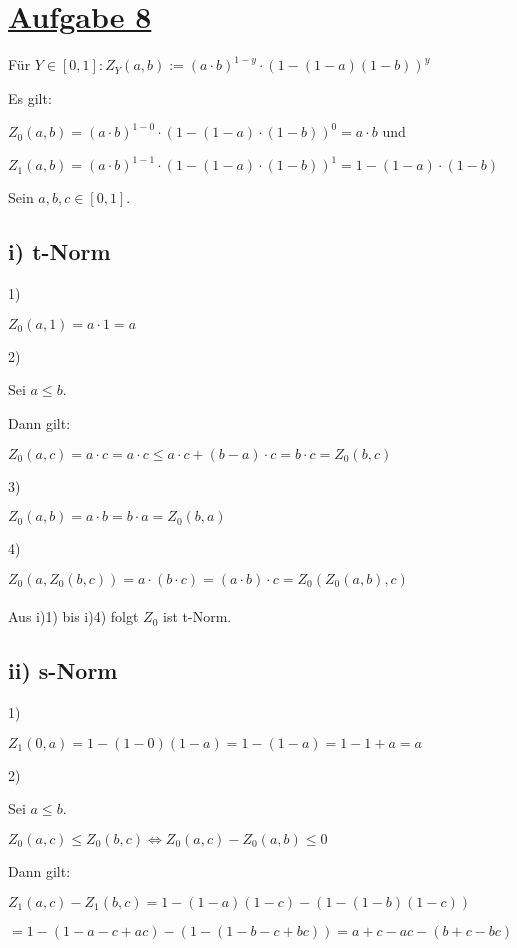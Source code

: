\section*{\underline{Aufgabe 8}}

Für $Y \in [0,1] : Z_Y (a,b) := (a\cdot b)^{1-y}\cdot(1-(1-a)(1-b))^y$

Es gilt:

$Z_0(a,b) = (a\cdot b)^{1-0} \cdot (1-(1-a)\cdot (1-b))^0 = a\cdot b $ und

$Z_1(a,b) = (a\cdot b)^{1-1} \cdot (1-(1-a)\cdot (1-b))^1 = 1-(1-a)\cdot (1-b) $

Sein $a,b,c \in [0,1]$.

\subsection*{i) t-Norm}
1) 

$Z_0(a,1) = a\cdot1 = a$

2) 

Sei $a \leq  b$.

Dann gilt:

$Z_0(a,c) = a\cdot c = a\cdot c \leq a\cdot c + (b-a)\cdot c = b\cdot c = Z_0(b,c)$

3) 

$Z_0(a,b) = a\cdot b = b\cdot a = Z_0(b,a)$

4)

$Z_0(a,Z_0(b,c)) = a\cdot (b\cdot c) = (a\cdot b)\cdot c = Z_0(Z_0(a,b),c)$

\paragraph*{}
Aus i)1) bis i)4) folgt $Z_0$ ist t-Norm.


\subsection*{ii) s-Norm}

1) 

$Z_1(0,a) = 1-(1-0)(1-a) = 1-(1-a) = 1-1+a= a$

2) 

Sei $a \leq  b$.

$Z_0(a,c) \leq Z_0(b,c) \Leftrightarrow Z_0(a,c) - Z_0(a,b) \leq 0$

Dann gilt:

$Z_1(a,c) - Z_1(b,c) = 1 - (1-a)(1-c) - (1 - (1-b)(1-c))$

$= 1-(1-a-c+ac)- (1-(1-b-c+bc)) = a+c-ac - (b+c-bc)$

